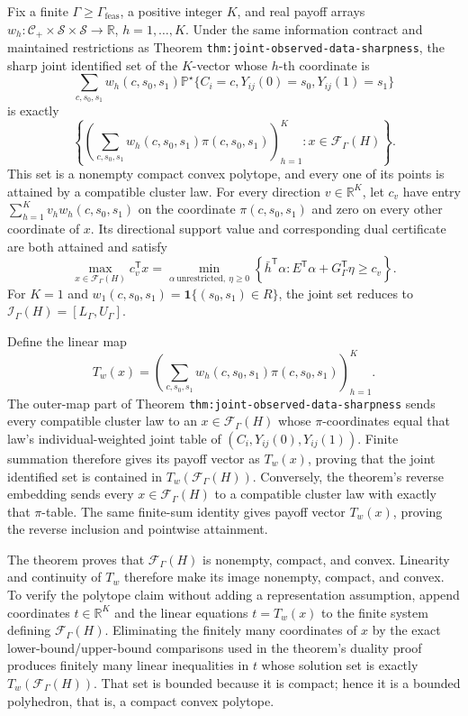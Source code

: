 Fix a finite \(\Gamma\geq\Gamma_{\mathrm{feas}}\), a positive integer \(K\), and real payoff arrays \(w_h:\mathcal C_+\times\mathcal S\times\mathcal S\to\mathbb R\), \(h=1,\ldots,K\).  Under the same information contract and maintained restrictions as Theorem \texttt{thm:joint-observed-data-sharpness}, the sharp joint identified set of the \(K\)-vector whose \(h\)-th coordinate is
\[
\sum_{c,s_0,s_1}w_h(c,s_0,s_1)
\mathbb P^{\star}\{C_i=c,Y_{ij}(0)=s_0,Y_{ij}(1)=s_1\}
\]
is exactly
\[
\left\{
\left(\sum_{c,s_0,s_1}w_h(c,s_0,s_1)\pi(c,s_0,s_1)\right)_{h=1}^{K}
:x\in\mathcal F_{\Gamma}(H)
\right\}.
\]
This set is a nonempty compact convex polytope, and every one of its points is attained by a compatible cluster law.  For every direction \(v\in\mathbb R^K\), let \(c_v\) have entry \(\sum_{h=1}^K v_h w_h(c,s_0,s_1)\) on the coordinate \(\pi(c,s_0,s_1)\) and zero on every other coordinate of \(x\).  Its directional support value and corresponding dual certificate are both attained and satisfy
\[
\max_{x\in\mathcal F_{\Gamma}(H)}c_v^{\mathsf T}x
=\min_{\alpha\ \mathrm{unrestricted},\ \eta\geq0}
\left\{\bar h^{\mathsf T}\alpha:
E^{\mathsf T}\alpha+G_{\Gamma}^{\mathsf T}\eta\geq c_v\right\}.
\]
For \(K=1\) and \(w_1(c,s_0,s_1)=\mathbf 1\{(s_0,s_1)\in R\}\), the joint set reduces to \(\mathcal I_{\Gamma}(H)=[L_{\Gamma},U_{\Gamma}]\).

Define the linear map
\[
T_w(x)=\left(\sum_{c,s_0,s_1}w_h(c,s_0,s_1)\pi(c,s_0,s_1)\right)_{h=1}^{K}.
\]
The outer-map part of Theorem \texttt{thm:joint-observed-data-sharpness} sends every compatible cluster law to an \(x\in\mathcal F_{\Gamma}(H)\) whose \(\pi\)-coordinates equal that law's individual-weighted joint table of \((C_i,Y_{ij}(0),Y_{ij}(1))\).  Finite summation therefore gives its payoff vector as \(T_w(x)\), proving that the joint identified set is contained in \(T_w(\mathcal F_{\Gamma}(H))\).  Conversely, the theorem's reverse embedding sends every \(x\in\mathcal F_{\Gamma}(H)\) to a compatible cluster law with exactly that \(\pi\)-table.  The same finite-sum identity gives payoff vector \(T_w(x)\), proving the reverse inclusion and pointwise attainment.

The theorem proves that \(\mathcal F_{\Gamma}(H)\) is nonempty, compact, and convex.  Linearity and continuity of \(T_w\) therefore make its image nonempty, compact, and convex.  To verify the polytope claim without adding a representation assumption, append coordinates \(t\in\mathbb R^K\) and the linear equations \(t=T_w(x)\) to the finite system defining \(\mathcal F_{\Gamma}(H)\).  Eliminating the finitely many coordinates of \(x\) by the exact lower-bound/upper-bound comparisons used in the theorem's duality proof produces finitely many linear inequalities in \(t\) whose solution set is exactly \(T_w(\mathcal F_{\Gamma}(H))\).  That set is bounded because it is compact; hence it is a bounded polyhedron, that is, a compact convex polytope.

